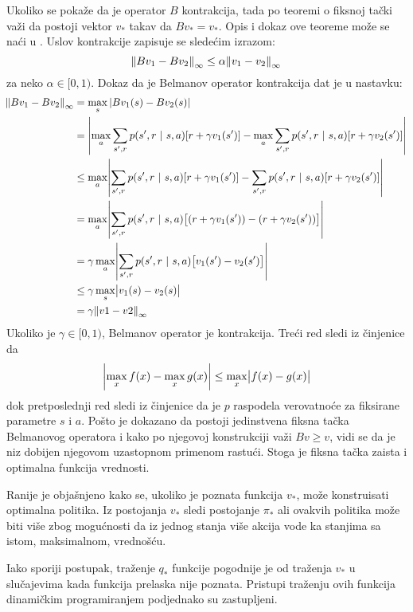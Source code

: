 Ukoliko se pokaže da je operator $B$ kontrakcija, tada po teoremi o fiksnoj tački važi da postoji vektor $v_*$ takav da $Bv_*=v_*$. Opis i dokaz ove teoreme može se naći u \cite{num_met}. Uslov kontrakcije zapisuje se sledećim izrazom:
\begin{equation}
	\norm{Bv_1-Bv_2}_{\infty} \leq \alpha \norm{v_1-v_2}_{\infty}
\end{equation}
za neko $\alpha \in [0, 1)$. 
Dokaz da je Belmanov operator kontrakcija dat je u nastavku:
\begin{align}
	\norm{Bv_1-Bv_2}_{\infty} &= \max_s |Bv_1(s)-Bv_2(s)| \\
	&= \mabs*{\max_{a}\sum_{s', r}^{} p(s', r~|~s,a)[r+\gamma v_1(s')] - \max_{a}\sum_{s', r}^{} p(s', r~|~s,a)[r+\gamma v_2(s')]} \\
	&\leq \max_{a} \mabs*{\sum_{s', r}^{} p(s', r~|~s,a)[r+\gamma v_1(s')] - \sum_{s', r}^{} p(s', r~|~s,a)[r+\gamma v_2(s')]} \\
	&=\max_{a} \mabs*{ \sum_{s', r}^{} p(s', r~|~s,a) \big[(r+\gamma v_1(s'))-(r+\gamma v_2(s'))\big]} \\
	&=\gamma\max_{a} \mabs*{ \sum_{s', r}^{} p(s', r~|~s,a)\big[v_1(s')-v_2(s')\big]} \\
	&\leq \gamma \max_s \mabs*{v_1(s)-v_2(s)} \\
	&= \gamma \norm{v1-v2}_{\infty}
\end{align}
Ukoliko je $\gamma \in [0, 1)$, Belmanov operator je kontrakcija. Treći red sledi iz činjenice da 
\begin{equation}
	\mabs*{\max_{x} f(x) - \max_{x} g(x)} \leq \max_{x}\mabs*{f(x)-g(x)}
\end{equation}
dok pretposlednji red sledi iz činjenice da je $p$ raspodela verovatnoće za fiksirane parametre $s$ i $a$. Pošto je dokazano da postoji jedinstvena fiksna tačka Belmanovog operatora i kako po njegovoj konstrukciji važi $Bv \geq v$, vidi se da je niz dobijen njegovom uzastopnom primenom rastući. Stoga je fiksna tačka zaista i optimalna funkcija vrednosti.
\par 
Ranije je objašnjeno kako se, ukoliko je poznata funkcija $v_*$, može konstruisati optimalna politika. Iz postojanja $v_*$ sledi postojanje $\pi_*$ ali ovakvih politika može biti više zbog mogućnosti da iz jednog stanja više akcija vode ka stanjima sa istom, maksimalnom, vrednošću. 
\par 
Iako sporiji postupak, traženje $q_*$ funkcije pogodnije je od traženja $v_*$ u slučajevima kada funkcija prelaska nije poznata. Pristupi traženju ovih funkcija dinamičkim programiranjem podjednako su zastupljeni. 
